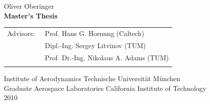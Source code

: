 \begin{center}
Oliver Oberinger\\
\vspace*{1.0cm}
{\bfseries Master's Thesis}\\
\vspace*{0.5cm}

\vspace*{3cm}




\vspace*{1.2cm}
\normalsize
\vfill
\begin{tabular}{ll}
Advisors: & ~Prof. Hans G. Hornung (Caltech)\\
\ & \ Dipl.-Ing. Sergey Litvinov (TUM)\\
\ & \ Prof. Dr.-Ing. Nikolaus A. Adams (TUM)\\
 \\
\end{tabular}

\vspace*{1.6cm}
Institute of Aerodynamics Technische Universit\"{a}t M\"{u}nchen\\
Graduate Aerospace Laboratories California Institute of Technology\\
2010	
\end{center}

\pagebreak
\pagestyle{plain}

%

